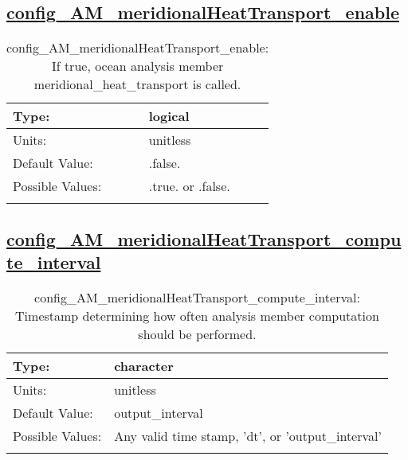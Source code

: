 \subsection[config\_AM\_meridionalHeatTransport\_enable]{\hyperref[sec:nm_tab_AM_meridionalHeatTransport]{config\_AM\_meridionalHeatTransport\_enable}}
\label{subsec:nm_sec_config_AM_meridionalHeatTransport_enable}
\begin{center}
\begin{longtable}{| p{2.0in} || p{4.0in} |}
    \hline
    Type: & logical \\
    \hline
    Units: & \si{unitless} \\
    \hline
    Default Value: & .false. \\
    \hline
    Possible Values: & .true. or .false. \\
    \hline
    \caption{config\_AM\_meridionalHeatTransport\_enable: If true, ocean analysis member meridional\_heat\_transport is called.}
\end{longtable}
\end{center}
\subsection[config\_AM\_meridionalHeatTransport\_compute\_interval]{\hyperref[sec:nm_tab_AM_meridionalHeatTransport]{config\_AM\_meridionalHeatTransport\_compute\_interval}}
\label{subsec:nm_sec_config_AM_meridionalHeatTransport_compute_interval}
\begin{center}
\begin{longtable}{| p{2.0in} || p{4.0in} |}
    \hline
    Type: & character \\
    \hline
    Units: & \si{unitless} \\
    \hline
    Default Value: & output\_interval \\
    \hline
    Possible Values: & Any valid time stamp, 'dt', or 'output\_interval' \\
    \hline
    \caption{config\_AM\_meridionalHeatTransport\_compute\_interval: Timestamp determining how often analysis member computation should be performed.}
\end{longtable}
\end{center}
